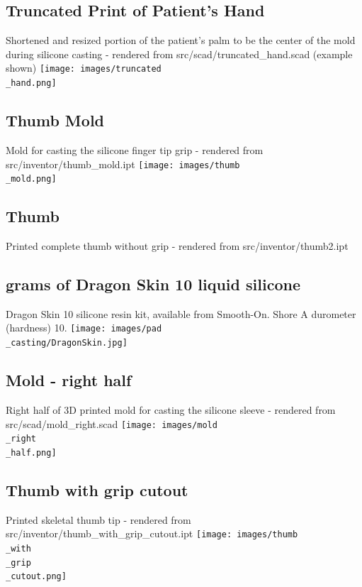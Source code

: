 \documentclass[11pt]{article}
\begin{document}
\hypertarget{thing_truncated\_hand}{\subsection{Truncated Print of Patient's Hand}}
Shortened and resized portion of the patient's palm to be the center of the mold during silicone casting - rendered from src/scad/truncated_hand.scad (example shown)
\texttt{[image: images/truncated\\\_hand.png]}

\hypertarget{thing_thumb\_mold}{\subsection{Thumb Mold}}
Mold for casting the silicone finger tip grip - rendered from src/inventor/thumb_mold.ipt
\texttt{[image: images/thumb\\\_mold.png]}

\hypertarget{thing_thumb2}{\subsection{Thumb}}
Printed complete thumb without grip - rendered from src/inventor/thumb2.ipt

\hypertarget{thing_g\_dragon\_skin\_10}{\subsection{grams of Dragon Skin 10 liquid silicone}}
Dragon Skin 10 silicone resin kit, available from Smooth-On. Shore A durometer (hardness) 10.
\texttt{[image: images/pad\\\_casting/DragonSkin.jpg]}

\hypertarget{thing_mold\_right\_half}{\subsection{Mold - right half}}
Right half of 3D printed mold for casting the silicone sleeve - rendered from src/scad/mold_right.scad
\texttt{[image: images/mold\\\_right\\\_half.png]}

\hypertarget{thing_thumb\_with\_grip\_cutout}{\subsection{Thumb with grip cutout}}
Printed skeletal thumb tip - rendered from src/inventor/thumb_with_grip_cutout.ipt
\texttt{[image: images/thumb\\\_with\\\_grip\\\_cutout.png]}
\end{document}
